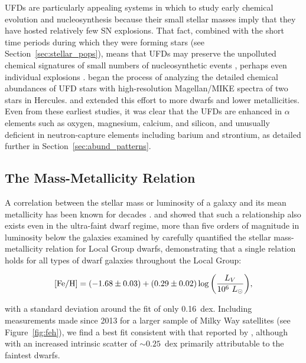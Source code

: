 \documentclass[a4paper]{ar-1col}
\newcommand{\feh}         {[Fe/H]}
\begin{document}
UFDs are particularly appealing systems in which to study early
chemical evolution and nucleosynthesis because their small stellar
masses imply that they have hosted relatively few SN explosions.  That
fact, combined with the short time periods during which they were
forming stars (see Section~\ref{sec:stellar_pops}), means that UFDs
may preserve the unpolluted chemical signatures of small numbers of
nucleosynthetic events \citep[][]{bh10,karlsson13}, perhaps even
individual explosions \citep[e.g.,][]{fb12,ji15}.  \citet{koch08}
began the process of analyzing the detailed chemical abundances of UFD
stars with high-resolution Magellan/MIKE spectra of two stars in
Hercules.  \citet{frebel10} and \citet{norris10b,norris10c} extended
this effort to more dwarfs and lower metallicities.  Even from these
earliest studies, it was clear that the UFDs are enhanced in $\alpha$
elements such as oxygen, magnesium, calcium, and silicon, and
unusually deficient in neutron-capture elements including barium and
strontium, as detailed further in Section~\ref{sec:abund_patterns}.


\subsection{The Mass-Metallicity Relation}

A correlation between the stellar mass or luminosity of a galaxy and
its mean metallicity has been known for decades \citep[e.g.,][and
  references therein]{tremonti04}.  \citet{sg07} and \citet{kirby08}
showed that such a relationship also exists even in the ultra-faint
dwarf regime, more than five orders of magnitude in luminosity below
the galaxies examined by \citeauthor{tremonti04}  \citet{kirby13b}
carefully quantified the stellar mass-metallicity relation for Local
Group dwarfs, demonstrating that a single relation holds for all types
of dwarf galaxies throughout the Local Group: 

\begin{equation}
{\rm \feh} = (-1.68 \pm 0.03) + (0.29 \pm
0.02)\log{\left(\frac{L_{V}}{10^{6}~L_{\odot}}\right)},
\end{equation}

\noindent
with a standard deviation around the fit of only 0.16~dex.  Including
measurements made since 2013 for a larger sample of Milky Way
satellites (see Figure~\ref{fig:feh}), we find a best fit consistent
with that reported by \citet{kirby13b}, although with an increased
intrinsic scatter of $\sim0.25$~dex primarily attributable to the
faintest dwarfs.
\end{document}
